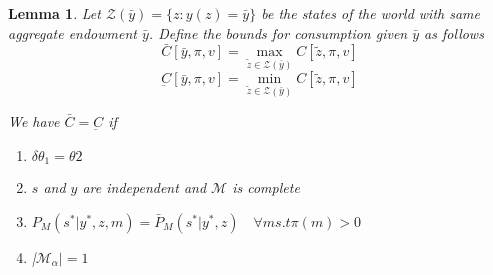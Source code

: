 \documentclass[12pt]{article}
\newtheorem*{lemma}{Lemma}
\begin{document}
\begin{lemma}
Let $\mathcal{Z}(\bar{y}) =\{z : y(z)=\bar{y}\}$ be the states of the world with same aggregate endowment $\bar{y}$. Define the bounds for consumption given $\bar{y}$ as follows
\[\bar{C}[\bar{y},\pi,v]=\max_{\tilde z \in \mathcal{Z}(\bar{y})}{C[\tilde z,\pi,v]}\]
\[\underbar{C}[\bar{y},\pi,v]=\min_{\tilde z \in \mathcal{Z}(\bar{y})}{C[\tilde z,\pi,v]}\]

We have $\bar {C}=\underbar{C}$ if 

\begin{enumerate}
\item $\delta\theta_1=\theta2$
\item $s$ and $y$ are independent and $\mathcal{M}$ is complete
\item $P_M(s^*|y^*,z,m)=\bar{P}_M(s^*|y^*,z) \quad \forall m s.t \pi(m) >0$
\item |$\mathcal{M}_{\alpha} |=1$
\end{enumerate}
\end{lemma}
\end{document}
